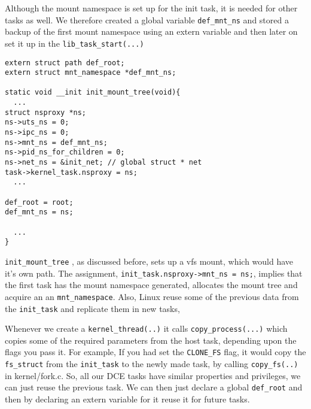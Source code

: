 \documentclass{sig-alternate}
\begin{document}
Although the mount namespace is set up for the init task, it is needed for other
tasks as well.  We therefore created a global variable \texttt{def\_mnt\_ns} and
stored a backup of the first mount namespace using an extern variable and then later on set it up in the \texttt{lib\_task\_start(...)}
\begin{lstlisting}[style=CStyle]
extern struct path def_root;
extern struct mnt_namespace *def_mnt_ns;

static void __init init_mount_tree(void){
  ...
struct nsproxy *ns;
ns->uts_ns = 0;
ns->ipc_ns = 0;
ns->mnt_ns = def_mnt_ns;
ns->pid_ns_for_children = 0;
ns->net_ns = &init_net; // global struct * net   
task->kernel_task.nsproxy = ns;
  ...

def_root = root;	
def_mnt_ns = ns;

  ...
}
\end{lstlisting}

\texttt{init\_mount\_tree} , as discussed before, sets up a vfs mount, which would have it's own path. The assignment, 
\texttt{init\_task.nsproxy->mnt\_ns = ns;}, implies that the first task has the mount namespace generated, allocates the mount tree and 
acquire an an \texttt{mnt\_namespace}. Also, Linux reuse some of the previous data from the \texttt{init\_task} and replicate them in new tasks,

Whenever we create a \texttt{kernel\_thread(..)} it calls \texttt{copy\_process(...)} which copies some of the required parameters from the host task, 
depending upon the flags you pass 
it. For example, If you had set the \texttt{CLONE\_FS} flag, it would copy the \texttt{fs\_struct} from the \texttt{init\_task} to the newly made task, 
by calling \texttt{copy\_fs(..)}
in kernel/fork.c. So, all our DCE tasks have similar properties and privileges, we can just reuse the previous task. 
We can then just declare a global \texttt{def\_root} and then by declaring an extern variable for it reuse it for future tasks.
\end{document}
